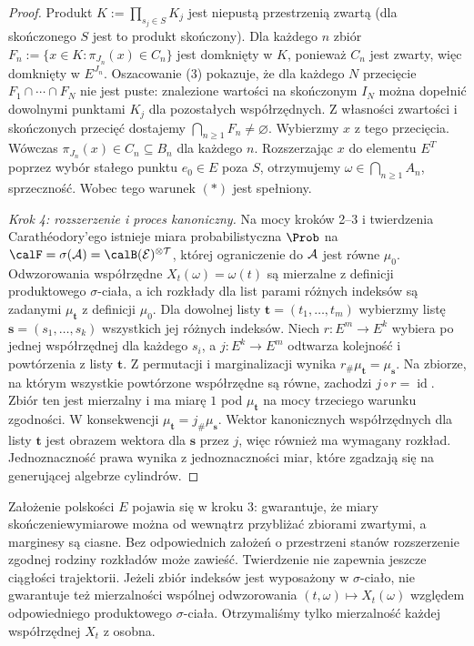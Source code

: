 \begin{proof}
Produkt $K:=\prod_{s_j\in S}K_j$ jest niepustą przestrzenią
zwartą (dla skończonego $S$ jest to produkt skończony).
Dla każdego $n$ zbiór
$F_n:=\{x\in K:\pi_{J_n}(x)\in C_n\}$
jest domknięty w $K$, ponieważ $C_n$ jest zwarty,
więc domknięty w $E^{J_n}$. Oszacowanie (3) pokazuje,
że dla każdego $N$ przecięcie $F_1\cap\cdots\cap F_N$
nie jest puste: znalezione wartości na skończonym $I_N$
można dopełnić dowolnymi punktami $K_j$ dla
pozostałych współrzędnych. Z własności zwartości
i skończonych przecięć dostajemy
$\bigcap_{n\ge1}F_n\ne\varnothing$.
Wybierzmy $x$ z tego przecięcia. Wówczas
$\pi_{J_n}(x)\in C_n\subseteq B_n$ dla każdego $n$.
Rozszerzając $x$ do elementu $E^T$ poprzez wybór
stałego punktu $e_0\in E$ poza $S$, otrzymujemy
$\omega\in\bigcap_{n\ge1}A_n$, sprzeczność.
Wobec tego warunek $(*)$ jest spełniony.

\emph{Krok 4: rozszerzenie i proces kanoniczny.}
Na mocy kroków 2--3 i twierdzenia Carathéodory'ego istnieje
miara probabilistyczna $\Prob$ na
$\calF=\sigma(\cal A)=\calB(E)^{\otimes T}$,
której ograniczenie do $\cal A$ jest równe $\mu_0$.
Odwzorowania współrzędne $X_t(\omega)=\omega(t)$ są
mierzalne z definicji produktowego $\sigma$-ciała,
a ich rozkłady dla list parami różnych indeksów są zadanymi
$\mu_{\mathbf t}$ z definicji $\mu_0$.
Dla dowolnej listy $\mathbf t=(t_1,\ldots,t_m)$ wybierzmy
listę $\mathbf s=(s_1,\ldots,s_k)$ wszystkich jej różnych
indeksów. Niech $r:E^m\to E^k$ wybiera po jednej
współrzędnej dla każdego $s_i$, a $j:E^k\to E^m$
odtwarza kolejność i powtórzenia z listy $\mathbf t$.
Z permutacji i marginalizacji wynika
$r_\#\mu_{\mathbf t}=\mu_{\mathbf s}$.
Na zbiorze, na którym wszystkie powtórzone współrzędne
są równe, zachodzi $j\circ r=\operatorname{id}$.
Zbiór ten jest mierzalny i ma miarę $1$ pod $\mu_{\mathbf t}$
na mocy trzeciego warunku zgodności. W konsekwencji
$\mu_{\mathbf t}=j_\#\mu_{\mathbf s}$.
Wektor kanonicznych współrzędnych dla listy $\mathbf t$
jest obrazem wektora dla $\mathbf s$ przez $j$, więc
również ma wymagany rozkład.
Jednoznaczność prawa wynika z jednoznaczności miar,
które zgadzają się na generującej algebrze cylindrów.
\end{proof}

\begin{uwaga}
Założenie polskości $E$ pojawia się w kroku 3: gwarantuje,
że miary skończeniewymiarowe można od wewnątrz
przybliżać zbiorami zwartymi, a marginesy są ciasne.
Bez odpowiednich założeń o przestrzeni stanów
rozszerzenie zgodnej rodziny rozkładów może zawieść.
Twierdzenie nie zapewnia jeszcze ciągłości trajektorii.
Jeżeli zbiór indeksów jest wyposażony w $\sigma$-ciało,
nie gwarantuje też mierzalności wspólnej odwzorowania
$(t,\omega)\mapsto X_t(\omega)$ względem odpowiedniego
produktowego $\sigma$-ciała. Otrzymaliśmy tylko
mierzalność każdej współrzędnej $X_t$ z osobna.
\end{uwaga}

